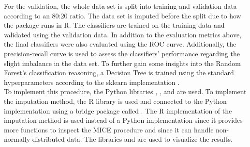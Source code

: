 For the validation, the whole data set is split into training and validation 
data according to an 80:20 ratio. The data set is imputed 
before the split 
due to how the  package runs in R. The classifiers are 
trained on the training data and validated using the validation data. 
In addition to the evaluation metrics above, the final classifiers were also 
evaluated using the ROC curve. Additionally, the 
precision-recall curve is used to assess the classifiers' performance 
regarding the slight imbalance in the data set. To further gain some insights 
into the Random Forest's classification reasoning, a Decision 
Tree is trained using the standard hyperparameters according to the sklearn 
implementation \cite{RN191}.
\\
To implement this procedure, the Python libraries , 
, and  are used. To implement the imputation method, 
the R library  
is used and connected to the Python implementation using a bridge package 
called . The R implementation of the imputation method is used 
instead of a Python implementation since it provides more functions to inspect 
the MICE procedure and since it can handle non-normally distributed data. The 
libraries  and  are used to visualize the 
results.

